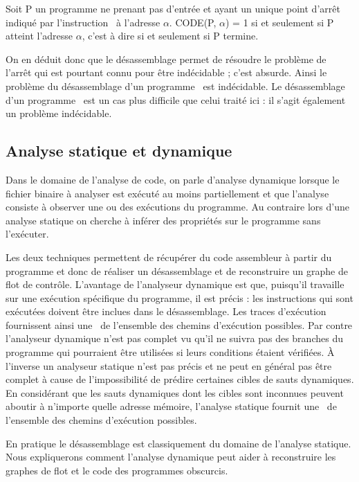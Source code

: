 Soit P un programme ne prenant pas d'entrée et ayant un unique point d'arrêt indiqué par l'instruction \halt\ à l'adresse $\alpha$.
CODE(P, $\alpha$) = 1 si et seulement si P atteint l'adresse $\alpha$, c'est à dire si et seulement si P termine.

On en déduit donc que le désassemblage permet de résoudre le problème de l'arrêt qui est pourtant connu pour être indécidable ; c'est absurde.
Ainsi le problème du désassemblage d'un programme \nsm\ est indécidable.
Le désassemblage d'un programme \sm\ est un cas plus difficile que celui traité ici : il s'agit également un problème indécidable.


\subsection{Analyse statique et dynamique}
Dans le domaine de l'analyse de code, on parle d'analyse dynamique lorsque le fichier binaire à analyser est exécuté au moins partiellement et que l'analyse consiste à observer une ou des exécutions du programme. Au contraire lors d'une analyse statique on cherche à inférer des propriétés sur le programme sans l'exécuter.

Les deux techniques permettent de récupérer du code assembleur à partir du programme et donc de réaliser un désassemblage et de reconstruire un graphe de flot de contrôle.
L'avantage de l'analyseur dynamique est que, puisqu'il travaille sur une exécution spécifique du programme, il est précis : les instructions qui sont exécutées doivent être inclues dans le désassemblage.
Les traces d'exécution fournissent ainsi une \sousa\ de l'ensemble des chemins d'exécution possibles.
Par contre l'analyseur dynamique n'est pas complet vu qu'il ne suivra pas des branches du programme qui pourraient être utilisées si leurs conditions étaient vérifiées. À l'inverse un analyseur statique n'est pas précis et ne peut en général pas être complet à cause de l'impossibilité de prédire certaines cibles de sauts dynamiques. En considérant que les sauts dynamiques dont les cibles sont inconnues peuvent aboutir à n'importe quelle adresse mémoire, l'analyse statique fournit une \sura\ de l'ensemble des chemins d'exécution possibles.

En pratique le désassemblage est classiquement du domaine de l'analyse statique. Nous expliquerons comment l'analyse dynamique peut aider à reconstruire les graphes de flot et le code des programmes obscurcis.


